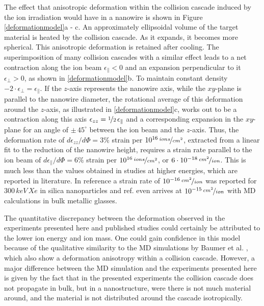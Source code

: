 The effect that anisotropic deformation within the collision cascade induced by the ion irradiation would have in a nanowire is shown in Figure \ref{deformationmodel}a - c. An approximately ellipsoidal volume of the target material is heated by the collision cascade. As it expands, it becomes more spherical. This anisotropic deformation is retained after cooling. The superimposition of many collision cascades with a similar effect leads to a net contraction along the ion beam $\epsilon_{\parallel} < 0$ and an expansion perpendicular to it $\epsilon_{\perp} > 0$, as shown in \ref{deformationmodel}b. To maintain constant density $-2\cdot\epsilon_{\perp} =  \epsilon_{\parallel}$. If the $z$-axis represents the nanowire axis, while the $xy$-plane is parallel to the nanowire diameter, the rotational average of this deformation around the $z$-axis, as illustrated in \ref{deformationmodel}c, works out to be a contraction along this axis $\epsilon_{zz} = \nicefrac{1}{2}\,\epsilon_{\parallel}$ and a corresponding expansion in the $xy$-plane for an angle of $\pm\, 45^\circ$ between the ion beam and the $z$-axis. Thus, the deformation rate of $d\epsilon_{zz}/d\Phi = 3\%$ strain per $10^{16}\,\nicefrac{ions}{cm^2}$, extracted from a linear fit to the reduction of the nanowire height, requires a strain rate parallel to the ion beam of $d\epsilon_{\parallel}/d\Phi = 6\%$ strain per $10^{16}\,\nicefrac{ions}{cm^2}$, or $6\cdot 10^{-18}\,\nicefrac{cm^2}{ion}$. This is much less than the values obtained in studies at higher energies, which are reported in literature. In reference \cite{dillen_ion_2003} a strain rate of $10^{-16}\,\nicefrac{cm^2}{ion}$ was reported for $300\,keV\,Xe$ in silica nanoparticles and ref. \cite{baumer_prediction_2014} even arrives at $10^{-15}\,\nicefrac{cm^2}{ion}$ with MD calculations in bulk metallic glasses. 

The quantitative discrepancy between the deformation observed in the experiments presented here and published studies could certainly be attributed to the lower ion energy and ion mass. One could gain confidence in this model because of the qualitative similarity to the MD simulations by Baumer et al. \cite{baumer_prediction_2014}, which also show a deformation anisotropy within a collision cascade. However, a major difference between the MD simulation and the experiments presented here is given by the fact that in the presented experiments the collision cascade does not propagate in bulk, but in a nanostructure, were there is not much material around, and the material is not distributed around the cascade isotropically. 

